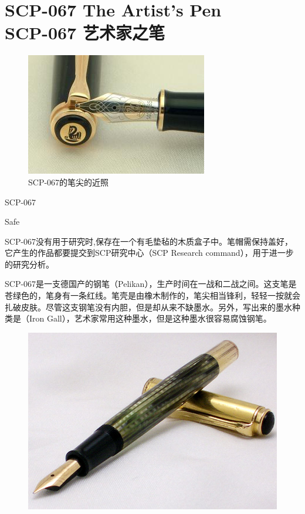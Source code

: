\chapter[SCP-067 艺术家之笔]{
    SCP-067 The Artist's Pen\\
    SCP-067 艺术家之笔
}

\label{chap:SCP-067}

\begin{figure}[H]
    \centering
    \includegraphics[width=0.5\linewidth]{images/SCP.067.jpg}
    \caption*{SCP-067的笔尖的近照}
\end{figure}

SCP-067

Safe

 SCP-067没有用于研究时,保存在一个有毛垫毡的木质盒子中。笔帽需保持盖好，它产生的作品都要提交到SCP研究中心（SCP Research command），用于进一步的研究分析。

SCP-067是一支德国产的钢笔（Pelikan），生产时间在一战和二战之间。这支笔是苍绿色的，笔身有一条红线。笔壳是由橡木制作的，笔尖相当锋利，轻轻一按就会扎破皮肤。尽管这支钢笔没有内胆，但是却从来不缺墨水。另外，写出来的墨水种类是（Iron Gall），艺术家常用这种墨水，但是这种墨水很容易腐蚀钢笔。

\begin{figure}[H]
    \centering
    \includegraphics[width=0.5\linewidth]{images/SCP.067.2.jpg}
    \caption*{}
\end{figure}

